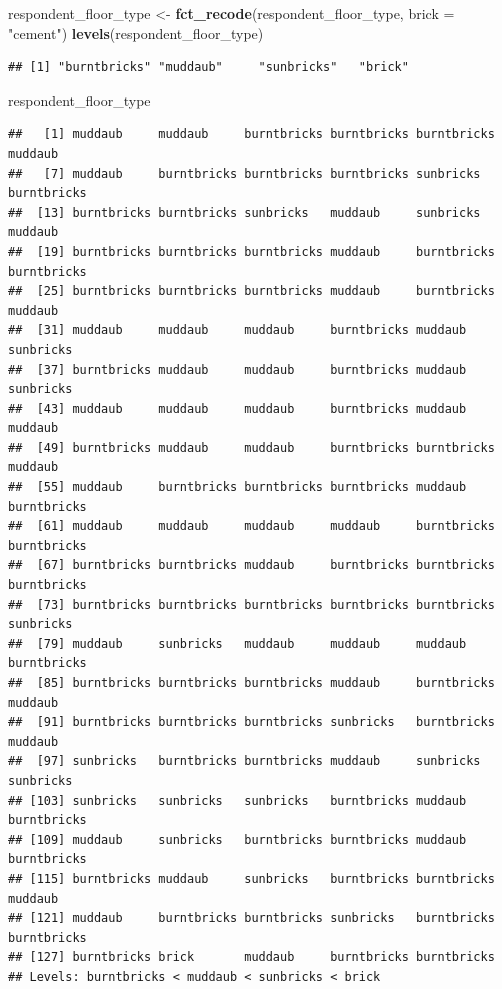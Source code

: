 \documentclass[]{book}
\newenvironment{Shaded}{\begin{snugshade}}{\end{snugshade}}
\newcommand{\KeywordTok}[1]{\textcolor[rgb]{0.13,0.29,0.53}{\textbf{#1}}}
\newcommand{\DataTypeTok}[1]{\textcolor[rgb]{0.13,0.29,0.53}{#1}}
\newcommand{\StringTok}[1]{\textcolor[rgb]{0.31,0.60,0.02}{#1}}
\newcommand{\NormalTok}[1]{#1}
\begin{document}
\begin{Shaded}
\begin{Highlighting}[]
\NormalTok{respondent_floor_type <-}\StringTok{ }\KeywordTok{fct_recode}\NormalTok{(respondent_floor_type, }\DataTypeTok{brick =} \StringTok{"cement"}\NormalTok{)}
\KeywordTok{levels}\NormalTok{(respondent_floor_type)}
\end{Highlighting}
\end{Shaded}

\begin{verbatim}
## [1] "burntbricks" "muddaub"     "sunbricks"   "brick"
\end{verbatim}

\begin{Shaded}
\begin{Highlighting}[]
\NormalTok{respondent_floor_type}
\end{Highlighting}
\end{Shaded}

\begin{verbatim}
##   [1] muddaub     muddaub     burntbricks burntbricks burntbricks muddaub    
##   [7] muddaub     burntbricks burntbricks burntbricks sunbricks   burntbricks
##  [13] burntbricks burntbricks sunbricks   muddaub     sunbricks   muddaub    
##  [19] burntbricks burntbricks burntbricks muddaub     burntbricks burntbricks
##  [25] burntbricks burntbricks burntbricks muddaub     burntbricks muddaub    
##  [31] muddaub     muddaub     muddaub     burntbricks muddaub     sunbricks  
##  [37] burntbricks muddaub     muddaub     burntbricks muddaub     sunbricks  
##  [43] muddaub     muddaub     muddaub     burntbricks muddaub     muddaub    
##  [49] burntbricks muddaub     muddaub     burntbricks burntbricks muddaub    
##  [55] muddaub     burntbricks burntbricks burntbricks muddaub     burntbricks
##  [61] muddaub     muddaub     muddaub     muddaub     burntbricks burntbricks
##  [67] burntbricks burntbricks muddaub     burntbricks burntbricks burntbricks
##  [73] burntbricks burntbricks burntbricks burntbricks burntbricks sunbricks  
##  [79] muddaub     sunbricks   muddaub     muddaub     muddaub     burntbricks
##  [85] burntbricks burntbricks burntbricks muddaub     burntbricks muddaub    
##  [91] burntbricks burntbricks burntbricks sunbricks   burntbricks muddaub    
##  [97] sunbricks   burntbricks burntbricks muddaub     sunbricks   sunbricks  
## [103] sunbricks   sunbricks   sunbricks   burntbricks muddaub     burntbricks
## [109] muddaub     sunbricks   burntbricks burntbricks muddaub     burntbricks
## [115] burntbricks muddaub     sunbricks   burntbricks burntbricks muddaub    
## [121] muddaub     burntbricks burntbricks sunbricks   burntbricks burntbricks
## [127] burntbricks brick       muddaub     burntbricks burntbricks
## Levels: burntbricks < muddaub < sunbricks < brick
\end{verbatim}
\end{document}

